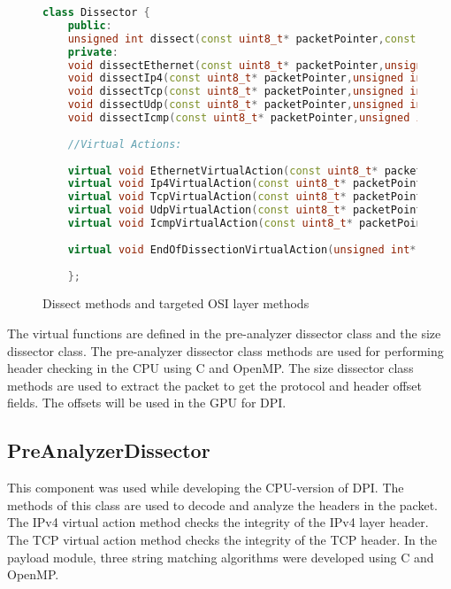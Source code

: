 \begin{figure}[H]
	\centering
	\begin{lstlisting}[frame=none,language=C++] 
	class Dissector {
	public:
	unsigned int dissect(const uint8_t* packetPointer,const struct pcap_pkthdr* hdr,const int deviceDataLinkInfo,void* user);
	private:
	void dissectEthernet(const uint8_t* packetPointer,unsigned int * totalHeaderLength,const struct pcap_pkthdr* hdr,void* user);
	void dissectIp4(const uint8_t* packetPointer,unsigned int * totalHeaderLength,const struct pcap_pkthdr* hdr,void* user);
	void dissectTcp(const uint8_t* packetPointer,unsigned int * totalHeaderLength,const struct pcap_pkthdr* hdr,void* user);
	void dissectUdp(const uint8_t* packetPointer,unsigned int * totalHeaderLength,const struct pcap_pkthdr* hdr,void* user);
	void dissectIcmp(const uint8_t* packetPointer,unsigned int * totalHeaderLength,const struct pcap_pkthdr* hdr,void* user);
	
	//Virtual Actions:
	
	virtual void EthernetVirtualAction(const uint8_t* packetPointer,unsigned int* totalHeaderLength,const struct pcap_pkthdr* hdr,Ethernet2Header* header,void* user)=0;
	virtual void Ip4VirtualAction(const uint8_t* packetPointer,unsigned int* totalHeaderLength,const struct pcap_pkthdr* hdr,Ip4Header* header,void* user)=0;
	virtual void TcpVirtualAction(const uint8_t* packetPointer,unsigned int* totalHeaderLength,const struct pcap_pkthdr* hdr,TcpHeader* header,void* user)=0;
	virtual void UdpVirtualAction(const uint8_t* packetPointer,unsigned int* totalHeaderLength,const struct pcap_pkthdr* hdr,UdpHeader* header,void* user)=0;
	virtual void IcmpVirtualAction(const uint8_t* packetPointer,unsigned int* totalHeaderLength,const struct pcap_pkthdr* hdr,IcmpHeader* header,void* user)=0;
	
	virtual void EndOfDissectionVirtualAction(unsigned int* totalHeaderLength,const struct pcap_pkthdr* hdr,void* user)=0;
	
	};
	\end{lstlisting}
	\caption[Dissect methods and targeted OSI layer methods]{Dissect methods and targeted OSI layer methods}
	\label{fig:calldissectmethods}
\end{figure}
\squeezeup

The virtual functions are defined in the pre-analyzer dissector class and the size dissector class. The pre-analyzer dissector class methods are used for performing header checking in the CPU using C and OpenMP. The size dissector class methods are used to extract the packet to get the protocol and header offset fields. The offsets will be used in the GPU for DPI.

\subsection{PreAnalyzerDissector}
This component was used while developing the CPU-version of DPI. The methods of this class are used to decode and analyze the headers in the packet. The IPv4 virtual action method checks the integrity of the IPv4 layer header. The TCP virtual action method checks the integrity of the TCP header. In the payload module, three string matching algorithms were developed using C and OpenMP. 